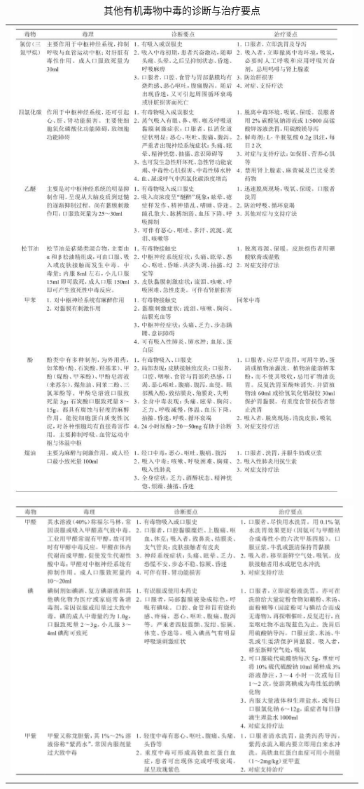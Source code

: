 \begin{longtable}{c}
 \caption{其他有机毒物中毒的诊断与治疗要点}
 \label{tab57-1}
 \endfirsthead
 \caption[]{其他有机毒物中毒的诊断与治疗要点}
 \endhead
 \includegraphics[width=\textwidth,height=\textheight,keepaspectratio]{./images/Image00217.jpg}\\
 \includegraphics[width=\textwidth,height=\textheight,keepaspectratio]{./images/Image00218.jpg}
 \end{longtable}

